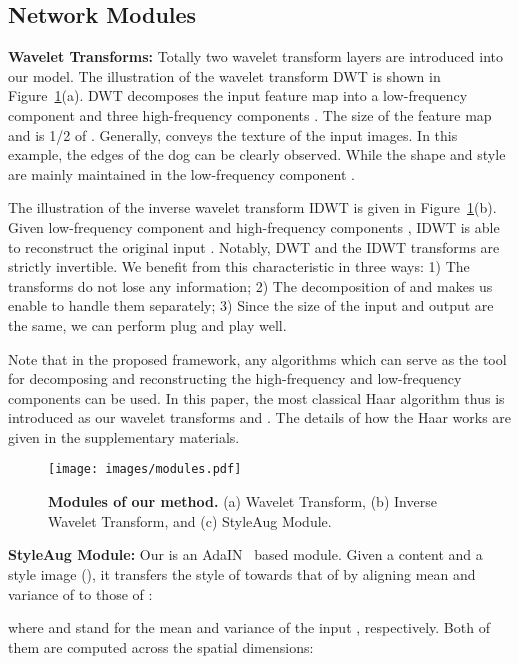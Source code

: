 \documentclass{article}
\begin{document}
\subsection{Network Modules}
\noindent\textbf{Wavelet Transforms:} Totally two wavelet transform layers are introduced into our model. The illustration of the wavelet transform DWT is shown in Figure~\ref{fig:modules}(a). DWT decomposes the input feature map  into a low-frequency component  and three high-frequency components . The size of the feature map  and  is 1/2 of . Generally,  conveys the texture of the input images. In this example, the edges of the dog can be clearly observed. 
While the shape and style are mainly maintained in the low-frequency component . 

The illustration of the inverse wavelet transform IDWT is given in Figure~\ref{fig:modules}(b). Given low-frequency component  and high-frequency components , IDWT is able to reconstruct the original input . Notably, DWT and the IDWT transforms are strictly invertible. We benefit from this characteristic in three ways: 1) The transforms do not lose any information; 2) The decomposition of  and  makes us enable to handle them separately; 3) Since the size of the input and output are the same, we can perform plug and play well. 


Note that in the proposed framework, any algorithms which can serve as the tool for decomposing and reconstructing the high-frequency and low-frequency components can be used. In this paper, the most classical Haar algorithm thus is introduced as our wavelet transforms  and . The details of how the Haar works are given in the supplementary materials.

\begin{figure}[h]
		\centering
		\vspace{-0.15in}
		{\texttt{[image: images/modules.pdf]}}
		\vspace{-0.15in}
		\caption{\textbf{Modules of our method.} (a) Wavelet Transform, (b) Inverse Wavelet Transform, and (c) StyleAug Module. }
		\label{fig:modules} 
		\vspace{-0.15in}
	\end{figure}	


\noindent\textbf{StyleAug Module:} Our  is an  AdaIN~\cite{huang2017arbitrary} based module.  Given a content  and a style image  (), it transfers the style of  towards that of  by aligning mean and variance of  to those of :   
	
	where  and  stand for the mean and variance
	of the input , respectively. Both of them are computed across the spatial dimensions:
	
\end{document}
